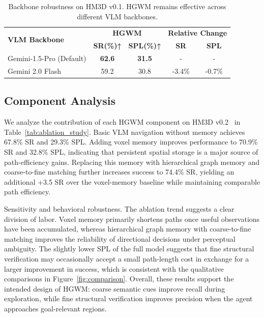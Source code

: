 \documentclass{article}
\begin{document}
\begin{table}[t]
\centering
\caption{Backbone robustness on HM3D v0.1. HGWM remains effective across different VLM backbones.}
\label{tab:vlm_robustness}
\footnotesize
\setlength{\tabcolsep}{4pt}
\begin{tabular}{l|cc|cc}
\hline
\multirow{2}{*}{\textbf{VLM Backbone}} & \multicolumn{2}{c|}{\textbf{HGWM}} & \multicolumn{2}{c}{\textbf{Relative Change}} \\
& \textbf{SR(\%)↑} & \textbf{SPL(\%)↑} & \textbf{SR} & \textbf{SPL} \\
\hline
Gemini-1.5-Pro (Default) & \textbf{62.6} & \textbf{31.5} & - & - \\
Gemini 2.0 Flash & 59.2 & 30.8 & -3.4\% & -0.7\% \\
\hline
\end{tabular}
\vspace{-0.2cm}
\end{table}


\subsection{Component Analysis}

We analyze the contribution of each HGWM component on HM3D v0.2~\citep{ramakrishnan2021habitat} in Table~\ref{tab:ablation_study}. Basic VLM navigation without memory achieves 67.8\% SR and 29.3\% SPL. Adding voxel memory improves performance to 70.9\% SR and 32.8\% SPL, indicating that persistent spatial storage is a major source of path-efficiency gains. Replacing this memory with hierarchical graph memory and coarse-to-fine matching further increases success to 74.4\% SR, yielding an additional +3.5 SR over the voxel-memory baseline while maintaining comparable path efficiency.

Sensitivity and behavioral robustness. The ablation trend suggests a clear division of labor. Voxel memory primarily shortens paths once useful observations have been accumulated, whereas hierarchical graph memory with coarse-to-fine matching improves the reliability of directional decisions under perceptual ambiguity. The slightly lower SPL of the full model suggests that fine structural verification may occasionally accept a small path-length cost in exchange for a larger improvement in success, which is consistent with the qualitative comparisons in Figure~\ref{fig:comparison}. Overall, these results support the intended design of HGWM: coarse semantic cues improve recall during exploration, while fine structural verification improves precision when the agent approaches goal-relevant regions.
\end{document}
